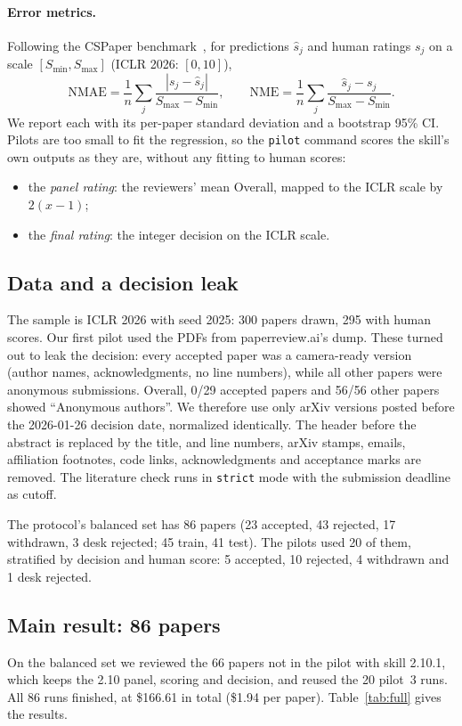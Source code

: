 \documentclass[11pt,a4paper]{article}
\newcommand{\code}[1]{\texttt{#1}}
\begin{document}
\paragraph{Error metrics.} Following the CSPaper benchmark~\citep{cspaper}, for predictions $\hat s_j$ and human
ratings $s_j$ on a scale $[S_{\min}, S_{\max}]$ (ICLR 2026: $[0,10]$),
\begin{equation}
\mathrm{NMAE} = \frac{1}{n}\sum_{j}\frac{|s_j - \hat s_j|}{S_{\max}-S_{\min}},\qquad
\mathrm{NME} = \frac{1}{n}\sum_{j}\frac{\hat s_j - s_j}{S_{\max}-S_{\min}}.
\end{equation}
We report each with its per-paper standard deviation and a bootstrap 95\% CI. Pilots are too small
to fit the regression, so the \code{pilot} command scores the skill's own outputs as they are,
without any fitting to human scores:
\begin{itemize}
\item the \emph{panel rating}: the reviewers' mean Overall, mapped to the ICLR scale by $2(x-1)$;
\item the \emph{final rating}: the integer decision on the ICLR scale.
\end{itemize}

\subsection{Data and a decision leak}
The sample is ICLR 2026 with seed 2025: 300 papers drawn, 295 with human scores. Our first pilot
used the PDFs from paperreview.ai's dump. These turned out to leak the decision: every accepted
paper was a camera-ready version (author names, acknowledgments, no line numbers), while all other
papers were anonymous submissions. Overall, 0/29 accepted papers and 56/56 other papers showed
``Anonymous authors''. We therefore use only arXiv versions posted before the 2026-01-26 decision
date, normalized identically. The header before the abstract is replaced by the title, and line
numbers, arXiv stamps, emails, affiliation footnotes, code links, acknowledgments and acceptance
marks are removed. The literature check runs in \code{strict} mode with the submission deadline as
cutoff.

The protocol's balanced set has 86 papers (23 accepted, 43 rejected, 17 withdrawn, 3 desk
rejected; 45 train, 41 test). The pilots used 20 of them, stratified by decision and human score:
5 accepted, 10 rejected, 4 withdrawn and 1 desk rejected.

\subsection{Main result: 86 papers}\label{sec:full}
On the balanced set we reviewed the 66 papers not in the pilot with skill 2.10.1,
which keeps the 2.10 panel, scoring and decision, and reused the 20 pilot~3 runs. All 86 runs
finished, at \$166.61 in total (\$1.94 per paper). Table~\ref{tab:full} gives the results.
\end{document}
